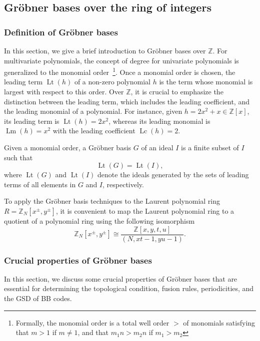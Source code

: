 \documentclass[aps,prb,english,superscriptaddress,twocolumn,tightenlines,showpacs,longbibliography,floatfix,amsfonts]{revtex4-2}
\begin{document}
\subsection{Gr\"{o}bner bases over the ring of integers}
\subsubsection{Definition of Gr\"{o}bner bases}
In this section, we give a brief introduction to Gr\"{o}bner bases over $\mathbb{Z}$. For multivariate polynomials, the concept of degree for univariate polynomials is generalized to the monomial order~\footnote{Formally, the monomial order is a total well order $>$ of monomials satisfying that $m>1$ if $m\neq 1$, and that $m_1n>m_2n$ if $m_1>m_2$}. Once a monomial order is chosen, the leading term $\operatorname{Lt}(h)$ of a non-zero polynomial $h$  is the term whose monomial is largest with respect to this order. Over $\mathbb{Z}$, it is crucial to emphasize the distinction between the leading term, which includes the leading coefficient, and the leading monomial of a polynomial. For instance, given $h=2x^2+x\in\mathbb{Z}[x]$, its leading term is $\operatorname{Lt}(h)=2x^2$, whereas its leading monomial is $\operatorname{Lm}(h)=x^2$ with the leading coefficient $\operatorname{Lc}(h)=2$.

Given a monomial order, a Gr\"{o}bner basis $G$ of an ideal $I$ is a finite subset of $I$ such that
\begin{equation}
    \operatorname{Lt}(G)=\operatorname{Lt}(I),\label{eq:definition of Grobner basis}
\end{equation}
where $\operatorname{Lt}(G)$ and $\operatorname{Lt}(I)$ denote the ideals generated by the sets of leading terms of all elements in $G$ and $I$, respectively. 

To apply the Gr\"{o}bner basis techniques to the Laurent polynomial ring $R=\mathbb{Z}_N[x^{\pm},y^{\pm}]$, it is convenient to map the Laurent polynomial ring to a quotient of a polynomial ring using the following isomorphism
\begin{equation}
    \mathbb{Z}_N[x^{\pm},y^{\pm}]\cong\frac{\mathbb{Z}[x,y,t,u]}{(N,xt-1,yu-1)}.\label{eq:isomorphism_of_Laurent_ring}
\end{equation}
\subsubsection{Crucial properties of Gr\"{o}bner bases\label{sec7a2}}
In this section, we discuss some crucial properties of Gr\"{o}bner bases that are essential for determining the topological condition, fusion rules, periodicities, and the GSD of BB codes.
\end{document}
